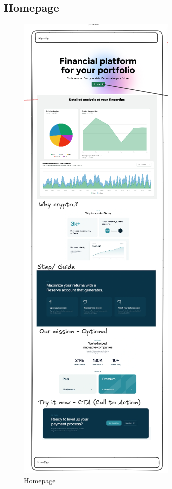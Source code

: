 \subsection{Homepage}
\begin{figure}[h]
    \centering
     \includegraphics[width= \textwidth, height=0.595\textheight, keepaspectratio]{root/homepage.png}
    \caption{Homepage}
    \label{fig:homepage}
\end{figure}
